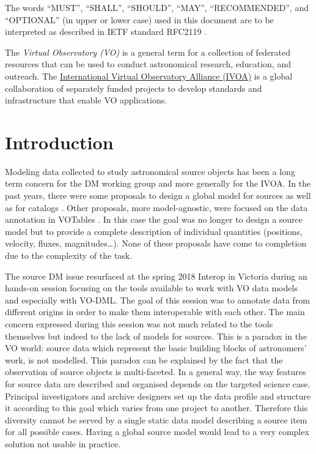 \documentclass[11pt,a4paper]{ivoa}
\begin{document}
The words ``MUST'', ``SHALL'', ``SHOULD'', ``MAY'', ``RECOMMENDED'', and
``OPTIONAL'' (in upper or lower case) used in this document are to be
interpreted as described in IETF standard RFC2119 \citep{std:RFC2119}.

The \emph{Virtual Observatory (VO)} is a
general term for a collection of federated resources that can be used
to conduct astronomical research, education, and outreach.
The \href{http://www.ivoa.net}{International
Virtual Observatory Alliance (IVOA)} is a global
collaboration of separately funded projects to develop standards and
infrastructure that enable VO applications.


\section{Introduction}

Modeling data collected to study astronomical source objects has been a long term concern for the 
DM working group and more generally for the IVOA.
In the past years, there were some proposals to design a global model for sources \citep{wd:jesusdm}
as well as for catalogs \citep{wd:catalog}.
Other proposals, more model-agnostic, were focused on the data annotation in VOTables
\citep{note:stcvot} \citep{note:seb}.
In this case the goal was no longer to design a source model but to provide a complete description of
individual quantities (positions, velocity, fluxes, magnitudes…).
None of these proposals have come to completion due to the complexity of the task.

The source DM issue resurfaced at the spring 2018 Interop in Victoria during an hands-on session
focusing on the tools available to work with VO data models and especially with VO-DML.
The goal of this session was to annotate data from different origins in order to make them
interoperable with each other.
The main concern expressed during this session was not much related to the tools themselves
but indeed to the lack of models for sources.
This is a paradox in the VO world: source data which represent the basic building
blocks of astronomers' work, is not modelled.
This paradox can be explained by the fact that the observation of source objects is multi-faceted.
In a general way, the way features for source data are described and organised depends on
the targeted science case.
Principal investigators and archive designers set up the data profile and structure it according
to this goal which varies from one project to another.
Therefore this diversity cannot be served by a single static data model describing a source
item for all possible cases.
Having a global source model would lead to a very complex solution not usable in practice.
\end{document}
